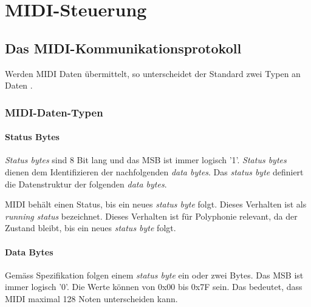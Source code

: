 
\chapter{MIDI-Steuerung}\label{chap.midi}

\section{Das MIDI-Kommunikationsprotokoll}\label{sect.midi_spezification}

Werden MIDI Daten übermittelt, so unterscheidet der Standard zwei Typen an Daten \cite{Midi_specification}.

\subsection{MIDI-Daten-Typen}\label{datenytpen}

\subsubsection*{Status Bytes}

\textit{Status bytes} sind 8 Bit lang und das MSB ist immer logisch '1'.  \textit{Status bytes} dienen dem Identifizieren der nachfolgenden \textit{data bytes}. Das \textit{status byte} definiert die Datenstruktur der folgenden \textit{data bytes}.

MIDI behält einen Status, bis ein neues \textit{status byte} folgt. Dieses Verhalten ist als \textit{running status} bezeichnet. Dieses Verhalten ist für Polyphonie relevant, da der Zustand bleibt, bis ein neues \textit{status byte} folgt.

\subsubsection*{Data Bytes}

Gemäss Spezifikation folgen einem \textit{status byte} ein oder zwei Bytes. Das MSB ist immer logisch '0'. Die Werte können von 0x00 bis 0x7F sein. Das bedeutet, dass MIDI maximal 128 Noten unterscheiden kann.

